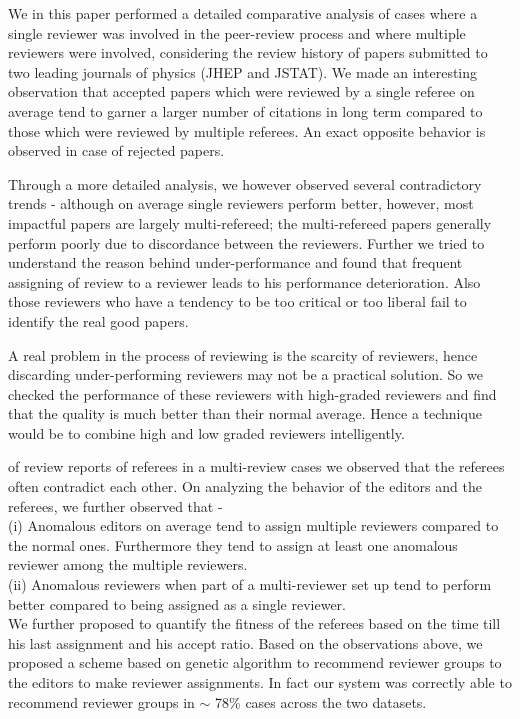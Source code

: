 \noindent
We in this paper performed a detailed comparative analysis of cases where a single reviewer was involved in the peer-review process and where multiple reviewers were involved, considering the review history of papers submitted to two leading journals of physics (JHEP and JSTAT). 
We made an interesting observation  that accepted papers which were reviewed by a single referee on average tend to garner a larger number of citations in 
long term compared to those which were reviewed by multiple referees. An exact opposite behavior is observed in case of rejected papers. 

Through a more detailed analysis, we however observed several contradictory trends - although on average single reviewers perform better, however, 
most impactful papers are largely multi-refereed;  the multi-refereed papers generally perform poorly due to discordance between the reviewers.
Further we tried to understand the reason behind under-performance and found that frequent assigning of review to a reviewer leads to his performance deterioration. 
Also those reviewers who have a tendency to be too critical or too liberal fail to identify the real good papers. 

A real problem in the process of reviewing is the scarcity of reviewers, hence discarding under-performing reviewers may not be a practical solution. 
So we checked the performance of these reviewers with high-graded reviewers and find that the quality is much better than their normal average. Hence a 
technique would be to combine high and low graded reviewers intelligently. 

 of review reports of referees in a multi-review cases we observed that the referees often contradict each other. On analyzing the behavior of the editors and the referees, we further observed that - \\
(i) Anomalous editors on average tend to assign multiple reviewers compared to the normal ones. Furthermore they tend to assign at least one anomalous reviewer among the multiple reviewers. \\
(ii) Anomalous reviewers when part of a multi-reviewer set up tend to perform better compared to being assigned as a single reviewer.\\

We further proposed to quantify the fitness of the referees based on the time till his last assignment and his accept ratio. 
\fi
Based on the observations above, we proposed a scheme based on genetic algorithm to recommend reviewer groups to the editors 
to make reviewer assignments. In fact our system was correctly able to recommend reviewer groups in $\sim$ 78\% cases across the two datasets.

